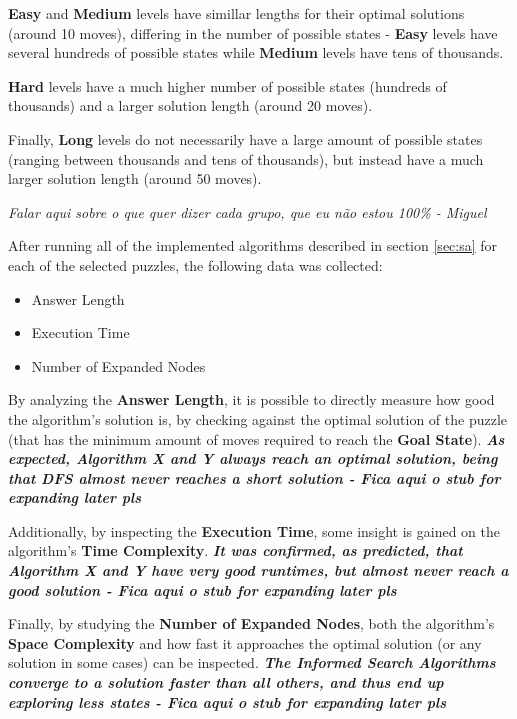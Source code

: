 \documentclass[conference]{IEEEtran}
\begin{document}
\textbf{Easy} and \textbf{Medium} levels have simillar lengths for their optimal solutions (around 10 moves), differing in the number of possible states - \textbf{Easy} levels have several hundreds of possible states while \textbf{Medium} levels have tens of thousands.

\textbf{Hard} levels have a much higher number of possible states (hundreds of thousands) and a larger solution length (around 20 moves).

Finally, \textbf{Long} levels do not necessarily have a large amount of possible states (ranging between thousands and tens of thousands), but instead have a much larger solution length (around 50 moves).

\begin{bf}
\textit{
Falar aqui sobre o que quer dizer cada grupo, que eu não estou 100\% - Miguel
}
\end{bf}

After running all of the implemented algorithms described in section \autoref{sec:sa} for each of the selected puzzles, the following data was collected:

\begin{itemize}
    \item Answer Length
    \item Execution Time
    \item Number of Expanded Nodes
\end{itemize}

By analyzing the \textbf{Answer Length}, it is possible to directly measure how good the algorithm's solution is, by checking against the optimal solution of the puzzle (that has the minimum amount of moves required to reach the \textbf{Goal State}). \textbf{\textit{As expected, Algorithm X and Y always reach an optimal solution, being that DFS almost never reaches a short solution - Fica aqui o stub for expanding later pls}}

Additionally, by inspecting the \textbf{Execution Time}, some insight is gained on the algorithm's \textbf{Time Complexity}. \textbf{\textit{It was confirmed, as predicted, that Algorithm X and Y have very good runtimes, but almost never reach a good solution - Fica aqui o stub for expanding later pls}}

Finally, by studying the \textbf{Number of Expanded Nodes}, both the algorithm's \textbf{Space Complexity} and how fast it approaches the optimal solution (or any solution in some cases) can be inspected. \textbf{\textit{The \textbf{Informed Search Algorithms} converge to a solution faster than all others, and thus end up exploring less states - Fica aqui o stub for expanding later pls}}
\end{document}
